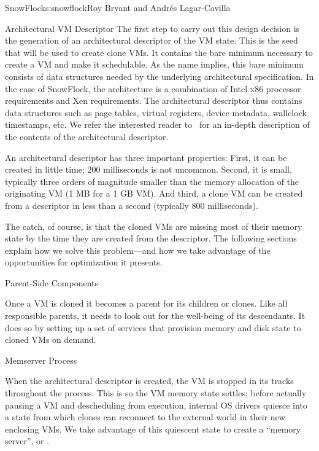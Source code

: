 \begin{aosachapter}{SnowFlock}{s:snowflock}{Roy Bryant and Andr\'e{s} Lagar-Cavilla}
\begin{aosasect1}{Architectural VM Descriptor}
The first step to carry out this design decision is the generation of
an architectural descriptor of the VM state. This is the seed that
will be used to create clone VMs. It contains the bare minimum
necessary to create a VM and make it schedulable. As the name implies,
this bare minimum consists of data structures needed by the underlying
architectural specification.  In the case of SnowFlock, the
architecture is a combination of Intel x86 processor requirements and
Xen requirements. The architectural descriptor thus contains data
structures such as page tables, virtual registers, device metadata,
wallclock timestamps, etc. We refer the interested reader to~\cite{bib:snowflocktocs}
for an in-depth description of the contents of the
architectural descriptor.

An architectural descriptor has three important properties: First, it
can be created in little time; 200 milliseconds is not
uncommon. Second, it is small, typically three orders of magnitude
smaller than the memory allocation of the originating VM (1 MB for a 1
GB VM). And third, a clone VM can be created from a descriptor in less
than a second (typically 800 milliseconds).

The catch, of course, is that the cloned VMs are missing most of their
memory state by the time they are created from the descriptor. The
following sections explain how we solve this problem---and how we take
advantage of the opportunities for optimization it presents.

\end{aosasect1}

\begin{aosasect1}{Parent-Side Components}

Once a VM is cloned it becomes a parent for its children or
clones.  Like all responsible parents, it needs to look out for the
well-being of its descendants. It does so by setting up a set of
services that provision memory and disk state to cloned VMs on demand.

\begin{aosasect2}{Memserver Process}

When the architectural descriptor is created, the VM is stopped in its
tracks throughout the process. This is so the VM memory state settles;
before actually pausing a VM and descheduling from execution,
internal OS drivers quiesce into a state from which clones can
reconnect to the external world in their new enclosing VMs. We take
advantage of this quiescent state to create a ``memory server'',
or .


\end{aosasect2}
\end{aosasect1}
\end{aosachapter}
